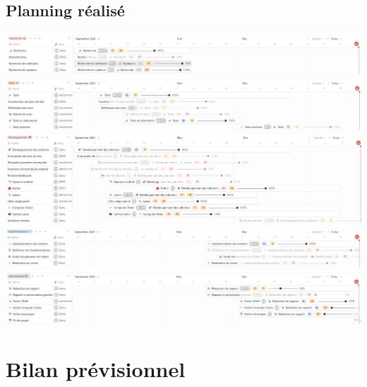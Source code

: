 \documentclass[11pt,titlepage]{report}
\begin{document}
\section{Planning réalisé}
\includegraphics[angle=90, height=0.95\textheight]{Images/business/planning/research.PNG}
\includegraphics[angle=90, height=0.95\textheight]{Images/business/planning/tests.PNG}
\includegraphics[angle=90, height=0.95\textheight]{Images/business/planning/dev.PNG}\newpage
\includegraphics[angle=90, height=0.95\textheight]{Images/business/planning/implementation.PNG}
\includegraphics[angle=90, height=0.95\textheight]{Images/business/planning/admin.PNG}

\chapter{Bilan prévisionnel}
\end{document}
